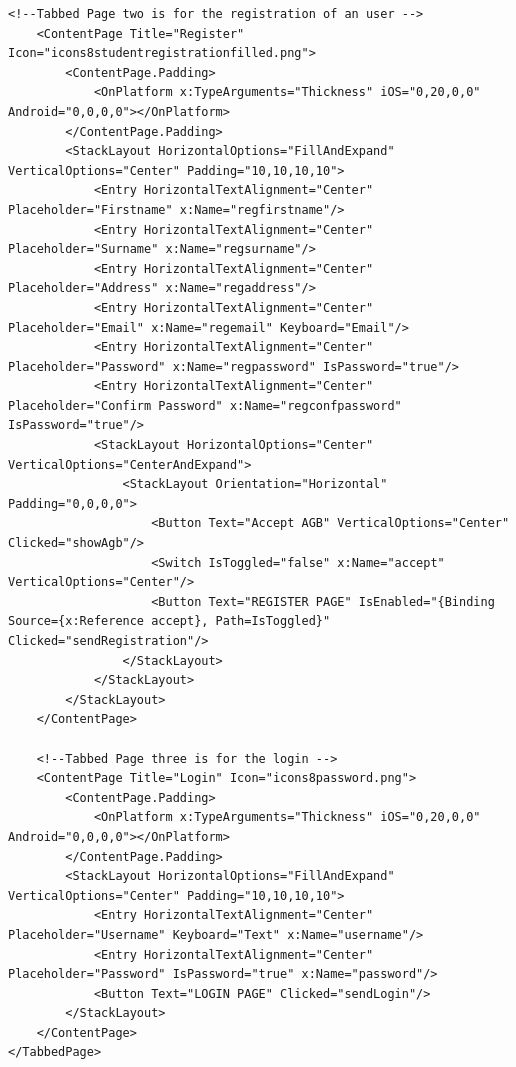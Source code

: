 \begin{lstlisting}[caption={MCKB - Design XAML Code},label={lst:mckbdesigncode},captionpos=b,style=XML-Own]
    <!--Tabbed Page two is for the registration of an user -->
    <ContentPage Title="Register" Icon="icons8studentregistrationfilled.png">
        <ContentPage.Padding>
            <OnPlatform x:TypeArguments="Thickness" iOS="0,20,0,0" Android="0,0,0,0"></OnPlatform>
        </ContentPage.Padding>
        <StackLayout HorizontalOptions="FillAndExpand" VerticalOptions="Center" Padding="10,10,10,10">
            <Entry HorizontalTextAlignment="Center" Placeholder="Firstname" x:Name="regfirstname"/>
            <Entry HorizontalTextAlignment="Center" Placeholder="Surname" x:Name="regsurname"/>
            <Entry HorizontalTextAlignment="Center" Placeholder="Address" x:Name="regaddress"/>
            <Entry HorizontalTextAlignment="Center" Placeholder="Email" x:Name="regemail" Keyboard="Email"/>
            <Entry HorizontalTextAlignment="Center" Placeholder="Password" x:Name="regpassword" IsPassword="true"/>
            <Entry HorizontalTextAlignment="Center" Placeholder="Confirm Password" x:Name="regconfpassword" IsPassword="true"/>
            <StackLayout HorizontalOptions="Center" VerticalOptions="CenterAndExpand">
                <StackLayout Orientation="Horizontal" Padding="0,0,0,0">
                    <Button Text="Accept AGB" VerticalOptions="Center" Clicked="showAgb"/>
                    <Switch IsToggled="false" x:Name="accept" VerticalOptions="Center"/>
                    <Button Text="REGISTER PAGE" IsEnabled="{Binding Source={x:Reference accept}, Path=IsToggled}" Clicked="sendRegistration"/>
                </StackLayout>
            </StackLayout>
        </StackLayout>
    </ContentPage>

    <!--Tabbed Page three is for the login -->
    <ContentPage Title="Login" Icon="icons8password.png">
        <ContentPage.Padding>
            <OnPlatform x:TypeArguments="Thickness" iOS="0,20,0,0" Android="0,0,0,0"></OnPlatform>
        </ContentPage.Padding>
        <StackLayout HorizontalOptions="FillAndExpand" VerticalOptions="Center" Padding="10,10,10,10">
            <Entry HorizontalTextAlignment="Center" Placeholder="Username" Keyboard="Text" x:Name="username"/>
            <Entry HorizontalTextAlignment="Center" Placeholder="Password" IsPassword="true" x:Name="password"/>
            <Button Text="LOGIN PAGE" Clicked="sendLogin"/>
        </StackLayout>
    </ContentPage>
</TabbedPage>
	\end{lstlisting}




